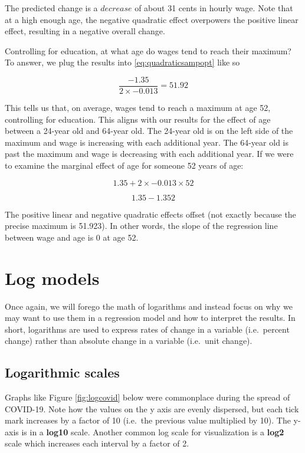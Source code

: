 \documentclass[
]{book}
\begin{document}
The predicted change is a \(decrease\) of about 31 cents in hourly wage. Note that at a high enough age, the negative quadratic effect overpowers the positive linear effect, resulting in a negative overall change.

Controlling for education, at what age do wages tend to reach their maximum? To answer, we plug the results into \eqref{eq:quadraticsampopt} like so

\[\frac{-1.35}{2 \times -0.013} = 51.92\]

This tells us that, on average, wages tend to reach a maximum at age 52, controlling for education. This aligns with our results for the effect of age between a 24-year old and 64-year old. The 24-year old is on the left side of the maximum and wage is increasing with each additional year. The 64-year old is past the maximum and wage is decreasing with each additional year. If we were to examine the marginal effect of age for someone 52 years of age:

\[1.35 + 2 \times -0.013 \times 52\]

\[1.35 - 1.352\]

The positive linear and negative quadratic effects offset (not exactly because the precise maximum is 51.923). In other words, the slope of the regression line between wage and age is 0 at age 52.

\hypertarget{log-models}{%
\section{Log models}\label{log-models}}

Once again, we will forego the math of logarithms and instead focus on why we may want to use them in a regression model and how to interpret the results. In short, logarithms are used to express rates of change in a variable (i.e.~percent change) rather than absolute change in a variable (i.e.~unit change).

\hypertarget{logarithmic-scales}{%
\subsection{Logarithmic scales}\label{logarithmic-scales}}

Graphs like Figure \ref{fig:logcovid} below were commonplace during the spread of COVID-19. Note how the values on the y axis are evenly dispersed, but each tick mark increases by a factor of 10 (i.e.~the previous value multiplied by 10). The y-axis is in a \textbf{log10} scale. Another common log scale for visualization is a \textbf{log2} scale which increases each interval by a factor of 2.
\end{document}
